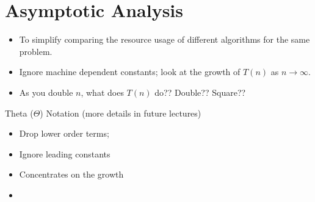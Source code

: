 \documentclass[12pt]{report}
\begin{document}
\section{Asymptotic Analysis}\label{sec:asymptotic-analysis}
\begin{itemize}
	\item To simplify comparing the resource usage of different algorithms for the same problem.
	\item Ignore machine dependent constants; look at the growth of $T(n)$ as $n\rightarrow\infty$.
	\item As you double $n$, what does $T(n)$ do?? Double?? Square??
\end{itemize}

\noindent Theta ($\Theta$) Notation (more details in future lectures)
\begin{itemize}
	\item Drop lower order terms;
	\item Ignore leading constants
	\item Concentrates on the growth
	\item {}
\end{itemize}

\noindent {}
\end{document}
